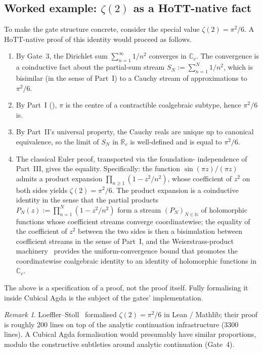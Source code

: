 \documentclass[12pt]{article}
\theoremstyle{definition}
\theoremstyle{remark}
\newtheorem{remark}[theorem]{Remark}
\newcommand{\N}{\mathbb{N}}
\newcommand{\R}{\mathbb{R}}
\newcommand{\C}{\mathbb{C}}
\newcommand{\Rc}{\R_{c}}
\newcommand{\Cc}{\C_{c}}
\begin{document}
\subsection{Worked example: \texorpdfstring{$\zeta(2)$}{zeta(2)} as a HoTT-native fact}\label{sec:zeta2}

To make the gate structure concrete, consider the special value
$\zeta(2) = \pi^2/6$. A HoTT-native proof of this identity would
proceed as follows.

\begin{enumerate}[leftmargin=*]
\item By Gate~3, the Dirichlet sum $\sum_{n=1}^\infty 1/n^2$ converges in
      $\Cc$. The convergence is a coinductive fact about the
      partial-sum stream
      $S_N := \sum_{n=1}^N 1/n^2$, which is bisimilar (in the sense of
      Part~I) to a Cauchy stream of approximations to $\pi^2/6$.
\item By Part~I (), $\pi$ is the centre of a
      contractible coalgebraic subtype, hence $\pi^2/6$ is.
\item By Part~II's universal property, the Cauchy reals are unique up
      to canonical equivalence, so the limit of $S_N$ in $\Rc$ is
      well-defined and is equal to $\pi^2/6$.
\item The classical Euler proof, transported via the foundation-
      independence of Part~III, gives the equality. Specifically: the
      function $\sin(\pi z)/(\pi z)$ admits a product expansion
      $\prod_{n \geq 1}(1 - z^2/n^2)$, whose coefficient of $z^2$ on
      both sides yields $\zeta(2) = \pi^2/6$. The product expansion is
      a coinductive identity in the sense that the partial products
      $P_N(z) := \prod_{n=1}^N (1-z^2/n^2)$ form a stream
      ${(P_N)}_{N \in \N}$ of holomorphic functions whose coefficient
      streams converge coordinatewise; the equality of the coefficient
      of $z^2$ between the two sides is then a bisimulation between
      coefficient streams in the sense of Part~I, and the
      Weierstrass-product machinery~\cite{Booij2020} provides the
      uniform-convergence bound that promotes the coordinatewise
      coalgebraic identity to an identity of holomorphic functions in
      $\Cc$.
\end{enumerate}

The above is a specification of a proof, not the proof itself. Fully
formalising it inside Cubical Agda is the subject of the gates'
implementation.

\begin{remark}
Loeffler--Stoll~\cite{loefflerstoll} formalised $\zeta(2) = \pi^2/6$ in
Lean / Mathlib; their proof is roughly 200 lines on top of the
analytic continuation infrastructure (3300 lines). A Cubical Agda
formalisation would presumably have similar proportions, modulo the
constructive subtleties around analytic continuation
(Gate~4).
\end{remark}
\end{document}
